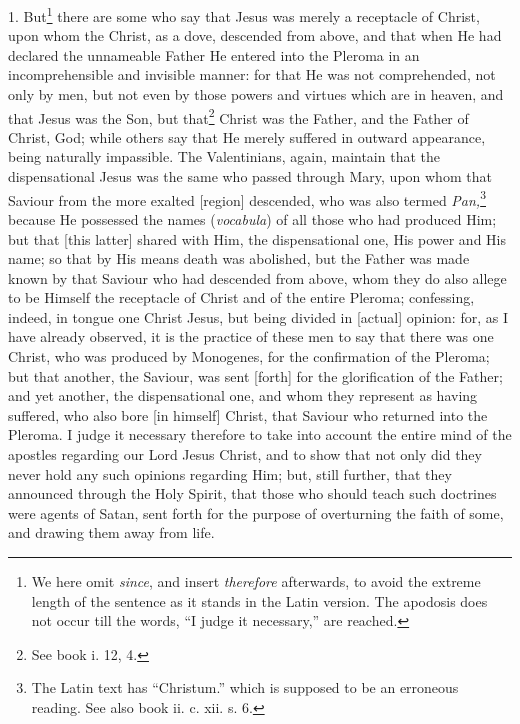 1. But\footnote{We here omit \emph{since}, and insert \emph{therefore} afterwards, to avoid the extreme length of the sentence as it stands in the Latin version. The apodosis does not occur till the words, “I judge it necessary,” are reached.} there are some who say that Jesus was merely a receptacle of Christ, upon whom the Christ, as a dove, descended from above, and that when He had declared the unnameable Father He entered into the Pleroma in an incomprehensible and invisible manner: for that He was not comprehended, not only by men, but not even by those powers and virtues which are in heaven, and that Jesus was the Son, but that\footnote{See book i. 12, 4.} Christ was the Father, and the Father of Christ, God; while others say that He merely suffered in outward appearance, being naturally impassible. The Valentinians, again, maintain that the dispensational Jesus was the same who passed through Mary, upon whom that Saviour from the more exalted [region] descended, who was also termed \emph{Pan,}\footnote{The Latin text has “Christum.” which is supposed to be an erroneous reading. See also book ii. c. xii. s. 6.} because He possessed the names (\emph{vocabula}) of all those who had produced Him; but that [this latter] shared with Him, the dispensational one, His power and His name; so that by His means death was abolished, but the Father was made known by that Saviour who had descended from above, whom they do also allege to be Himself the receptacle of Christ and of the entire Pleroma; confessing, indeed, in tongue one Christ Jesus, but being divided in [actual] opinion: for, as I have already observed, it is the practice of these men to say that there was one Christ, who was produced by Monogenes, for the confirmation of the Pleroma; but that another, the Saviour, was sent [forth] for the glorification of the Father; and yet another, the dispensational one, and whom they represent as having suffered, who also bore [in himself] Christ, that Saviour who returned into the Pleroma. I judge it necessary therefore to take into account the entire mind of the apostles regarding our Lord Jesus Christ, and to show that not only did they never hold any such opinions regarding Him; but, still further, that they announced through the Holy Spirit, that those who should teach such doctrines were agents of Satan, sent forth for the purpose of overturning the faith of some, and drawing them away from life.

